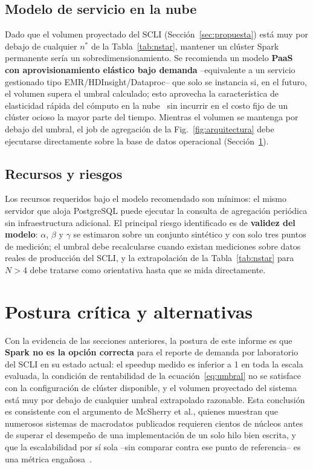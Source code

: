 \documentclass[10pt,journal]{IEEEtran}
\begin{document}
\subsection{Modelo de servicio en la nube}
Dado que el volumen proyectado del SCLI (Secci\'on~\ref{sec:propuesta}) est\'a
muy por debajo de cualquier $n^{*}$ de la Tabla~\ref{tab:nstar}, mantener un
cl\'uster Spark permanente ser\'ia un sobredimensionamiento. Se recomienda un
modelo \textbf{PaaS con aprovisionamiento el\'astico bajo demanda}
--equivalente a un servicio gestionado tipo EMR/HDInsight/Dataproc-- que solo
se instancia si, en el futuro, el volumen supera el umbral calculado; esto
aprovecha la caracter\'istica de elasticidad r\'apida del c\'omputo en la
nube~\cite{mell2011} sin incurrir en el costo fijo de un cl\'uster ocioso la
mayor parte del tiempo. Mientras el volumen se mantenga por debajo del umbral,
el job de agregaci\'on de la Fig.~\ref{fig:arquitectura} debe ejecutarse
directamente sobre la base de datos operacional (Secci\'on~\ref{sec:postura}).

\subsection{Recursos y riesgos}
Los recursos requeridos bajo el modelo recomendado son m\'inimos: el mismo
servidor que aloja PostgreSQL puede ejecutar la consulta de agregaci\'on
peri\'odica sin infraestructura adicional. El principal riesgo identificado es
de \textbf{validez del modelo}: $\alpha$, $\beta$ y $\gamma$ se estimaron sobre
un conjunto sint\'etico y con solo tres puntos de medici\'on; el umbral debe
recalcularse cuando existan mediciones sobre datos reales de producci\'on del
SCLI, y la extrapolaci\'on de la Tabla~\ref{tab:nstar} para $N>4$ debe tratarse
como orientativa hasta que se mida directamente.

\section{Postura cr\'itica y alternativas}
\label{sec:postura}

Con la evidencia de las secciones anteriores, la postura de este informe es
que \textbf{Spark no es la opci\'on correcta} para el reporte de demanda por
laboratorio del SCLI en su estado actual: el speedup medido es inferior a 1
en toda la escala evaluada, la condici\'on de rentabilidad de la
ecuaci\'on~\eqref{eq:umbral} no se satisface con la configuraci\'on de
cl\'uster disponible, y el volumen proyectado del sistema est\'a muy por
debajo de cualquier umbral extrapolado razonable. Esta conclusi\'on es
consistente con el argumento de McSherry et al., quienes muestran que
numerosos sistemas de macrodatos publicados requieren cientos de n\'ucleos
antes de superar el desempe\~no de una implementaci\'on de un solo hilo bien
escrita, y que la escalabilidad por s\'i sola --sin comparar contra ese
punto de referencia-- es una m\'etrica enga\~nosa~\cite{mcsherry2015}.
\end{document}
